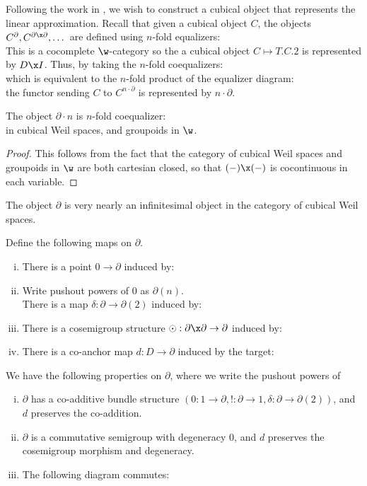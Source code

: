 Following the work in , we wish to construct a cubical object that represents the linear approximation. Recall that given a cubical object $C$, the objects $C^\partial, C^{\partial \x \partial}, \dots$ are defined using $n$-fold equalizers:
\[\]
This is a cocomplete $\w$-category so the a cubical object $C \mapsto T.C.2$ is represented by $D \x I$. Thus, by taking the $n$-fold coequalizers:
\[\]
which is equivalent to the $n$-fold product of the equalizer diagram:
\[\]
the functor sending $C$ to $C^{n\cdot \partial}$ is represented by $n\cdot \partial$.
\begin{proposition}
    The object $\partial \cdot n$ is $n$-fold coequalizer:
    \[\]
    in cubical Weil spaces, and groupoids in $\w$.
\end{proposition}
\begin{proof}
    This follows from the fact that the category of cubical Weil spaces and groupoids in $\w$ are both cartesian closed, so that $(-) \x (-)$ is cocontinuous in each variable.
\end{proof}
The object $\partial$ is very nearly an infinitesimal object in the category of cubical Weil spaces.
\begin{definition}\label{def:structure-maps-del}
    Define the following maps on $\partial$.
    \begin{enumerate}[(i)]
        \item There is a point $0 \to \partial$ induced by:
        \[\]
        \item Write pushout powers of $0$ as $\partial(n)$. 
        \[\]
        There is a map $\delta: \partial \to \partial(2)$ induced by:
        \[\]
        \item There is a cosemigroup structure $\odot: \partial \x \partial \to \partial$ induced by:
        \[\]
        \item There is a co-anchor map $d:D \to \partial$ induced by the target:
        \[\]
    \end{enumerate}
\end{definition}
\begin{lemma}%
\label{lem:structure-coherences}
    We have the following properties on $\partial$, where we write the pushout powers of 
    \begin{enumerate}[(i)]
        \item $\partial$ has a co-additive bundle structure $(0:1 \to \partial, !:\partial \to 1, \delta: \partial \to \partial(2))$, and $d$ preserves the co-addition.
        \item $\partial$ is a commutative semigroup with degeneracy $0$, and $d$ preserves the cosemigroup morphism and degeneracy.
        \item The following diagram commutes:
        \[\]
    \end{enumerate}
\end{lemma}

